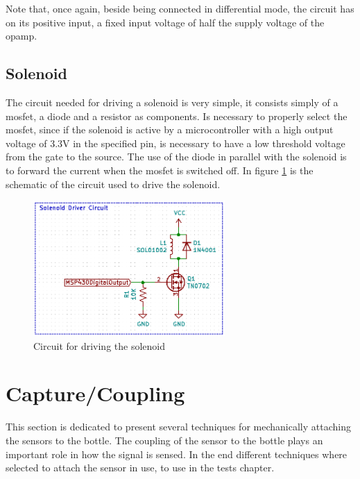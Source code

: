 Note that, once again, beside being connected in differential mode, the circuit has on its positive input, a fixed input voltage of half the supply voltage of the \acrshort{opamp}.
\subsection{Solenoid}
The circuit needed for driving a solenoid is very simple, it consists simply of a \acrshort{mosfet}, a diode and a resistor as components. Is necessary to properly select the \acrshort{mosfet}, since if the solenoid is active by a microcontroller with a high output voltage of 3.3V in the specified pin, is necessary to have a low threshold voltage from the gate to the source. The use of the diode in parallel with the solenoid is to forward the current when the \acrshort{mosfet} is switched off. In figure \ref{fig:solenoidshc} is the schematic of the circuit used to drive the solenoid.
\begin{figure}[]
    \centering
    \includegraphics[width=0.65\textwidth]{Chapters/4CHP/Figures/SolenoidDriver.PNG}
    \caption{Circuit for driving the solenoid}
    \label{fig:solenoidshc}
\end{figure}
\section{Capture/Coupling}\label{sec:CaptureCoupling}
This section is dedicated to present several techniques for mechanically attaching the sensors to the bottle. The coupling of the sensor to the bottle plays an important role in how the signal is sensed. In the end different techniques where selected to attach the sensor in use, to use in the tests chapter.
